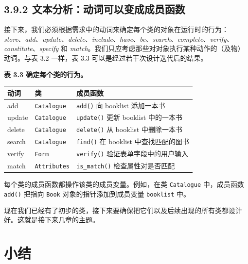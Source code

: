 \subsection{3.9.2 文本分析：动词可以变成成员函数}

接下来，我们必须根据需求中的动词来确定每个类的对象在运行时的行为：\emph{store}、\emph{add}、\emph{update}、\emph{delete}、\emph{include}、\emph{have}、\emph{be}、\emph{search}、\emph{complete}、\emph{verify}、\emph{constitute}、\emph{specify} 和 \emph{match}。我们只应考虑那些对对象执行某种动作的（及物）动词。与表 3.2 一样，表 3.3 可以是经过若干次设计迭代后的结果。

\begin{center}
{\bfseries 表 3.3 确定每个类的行为。}\par\vspace{3bp}
\begin{tabularx}{\textwidth}{XXX}
\toprule
动词 & 类 & 成员函数 \\
\midrule
add & \texttt{Catalogue} & \texttt{add()} 向 booklist 添加一本书 \\
update & \texttt{Catalogue} & \texttt{update()} 更新 booklist 中的一本书 \\
delete & \texttt{Catalogue} & \texttt{delete()} 从 booklist 中删除一本书 \\
search & \texttt{Catalogue} & \texttt{find()} 在 booklist 中查找匹配的图书 \\
verify & \texttt{Form} & \texttt{verify()} 验证表单字段中的用户输入 \\
match & \texttt{Attributes} & \texttt{is\_\allowbreak{}match(\allowbreak{})\allowbreak{}} 检查属性对是否匹配 \\
\bottomrule
\end{tabularx}
\end{center}

每个类的成员函数都操作该类的成员变量。例如，在类 \texttt{Catalogue} 中，成员函数 \texttt{add()} 把指向 \texttt{Book} 对象的指针添加到成员变量 \texttt{booklist} 中。


现在我们已经有了初步的类，接下来要确保把它们以及后续出现的所有类都设计好。这就是接下来几章的主题。

\section*{小结}

